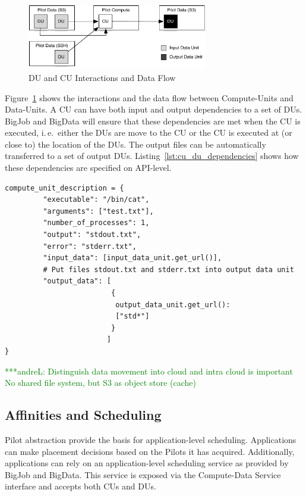 \documentclass[times]{cpeauth}
\newcommand{\alnote}[1]{ {\textcolor{green} { ***andreL: #1 }}}
\newcommand{\alnote}[1]{}
\newcommand{\pilot}{Pilot\xspace}
\newcommand{\pilots}{Pilots\xspace}
\newcommand{\computedataservice}{Compute-Data Service\xspace}
\newcommand{\computeunit}{Compute-Unit\xspace}
\newcommand{\computeunits}{Compute-Units\xspace}
\newcommand{\dataunit}{Data-Unit\xspace}
\newcommand{\dataunits}{Data-Units\xspace}
\newcommand{\dus}{DUs\xspace}
\newcommand{\cu}{CU\xspace}
\newcommand{\cus}{CUs\xspace}
\begin{document}
\begin{figure}[htbp]
	\centering
		\includegraphics[width=0.7\textwidth]{figures/data-flow.pdf}
	\caption{DU and CU Interactions and Data Flow}
	\label{fig:figures_data-flow}
\end{figure}

Figure~\ref{fig:figures_data-flow} shows the interactions and the data flow
between \computeunits and \dataunits. A \cu can have both input and output
dependencies to a set of \dus. BigJob and BigData will ensure that these
dependencies are met when the \cu is executed, i.\,e.\ either the \dus are
move to the \cu or the \cu is executed at (or close to) the location of the
\dus. The output files can be automatically transferred to a set of output
\dus. Listing~\ref{lst:cu_du_dependencies} shows how these dependencies are
specified on API-level.

\begin{lstlisting}[caption={{Managing \dataunit/\computeunit Dependencies}}, style=myPythonListing, label={lst:cu_du_dependencies}, float=t]
compute_unit_description = {
         "executable": "/bin/cat",
         "arguments": ["test.txt"],
         "number_of_processes": 1,
         "output": "stdout.txt",
         "error": "stderr.txt",   
         "input_data": [input_data_unit.get_url()],
         # Put files stdout.txt and stderr.txt into output data unit
         "output_data": [
                         {
                          output_data_unit.get_url(): 
                          ["std*"]
                         }
                        ]    
}
\end{lstlisting}

\alnote{
Distinguish data movement into cloud and intra cloud is important
No shared file system, but S3 as object store (cache)
}


\subsection{Affinities and Scheduling}

\pilot abstraction provide the basis for application-level scheduling. 
Applications can make placement decisions based on the \pilots it has 
acquired. Additionally, applications can rely on an application-level 
scheduling service as provided by BigJob and BigData. This service is exposed 
via the \computedataservice interface and accepts both \cus and \dus.
\end{document}
